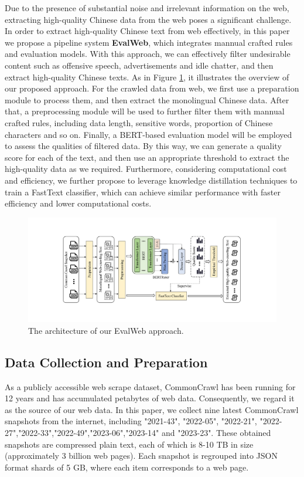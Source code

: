 \documentclass{article}
\begin{document}
Due to the presence of substantial noise and irrelevant information on the web, extracting high-quality Chinese data from the web poses a significant challenge. In order to extract high-quality Chinese text from web effectively, in this paper we propose a pipeline system \textbf{EvalWeb}, which integrates mannual crafted rules and evaluation models. With this approach, we can effectively filter undesirable content such as offensive speech, advertisements and idle chatter, and then extract high-quality Chinese texts. As in Figure \ref{fig1}, it illustrates the overview of our proposed approach. For the crawled data from web, we first use a preparation module to process them, and then extract the monolingual Chinese data. After that, a preprocessing module will be used to further filter them with mannual crafted rules, including data length, sensitive words, proportion of Chinese characters and so on. Finally, a BERT-based evaluation model will be employed to assess the qualities of filtered data. By this way, we can generate a quality score for each of the text, and then use an appropriate threshold to extract the high-quality data as we required. Furthermore, 
considering computational cost and efficiency, we further propose to leverage knowledge distillation\cite{stanton2021does} techniques to train a FastText classifier, which can achieve similar performance with faster efficiency and lower computational costs.

\begin{figure}[htbp]
  \centering
  \includegraphics[width=1\textwidth]{picture/BERTRater_final.pdf}
  \caption{The architecture of our EvalWeb approach.}
  \label{fig1}
\end{figure}

\subsection{Data Collection and Preparation}

As a publicly accessible web scrape dataset, CommonCrawl has been running for 12 years and has accumulated petabytes of web data. Consequently, we regard it as the source of our web data. In this paper, we collect nine latest CommonCrawl snapshots from the internet, including "2021-43", "2022-05", "2022-21", "2022-27","2022-33","2022-49","2023-06","2023-14" and "2023-23". These obtained snapshots are compressed plain text, each of which is 8-10 TB in size (approximately 3 billion web pages). Each snapshot is regrouped into JSON format shards of 5 GB, where each item corresponds to a web page. 
\end{document}
